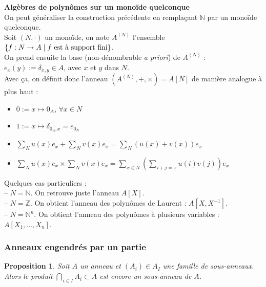 \documentclass{article}           %
\newcommand\N{\mathbb{N}}
\newcommand\Z{\mathbb{Z}}
\newcommand\summ[2]{\underset{#1}{\overset{#2}{\sum}}} 		%
\newcommand\capp[2]{\underset{#1}{\overset{#2}{\bigcap}}} 	%
\theoremstyle{break}
\theoremstyle{add}
\theoremstyle{break} %
\newtheorem{proposition}{Proposition}[section]
\theoremstyle{add}
\begin{document}
\vspace{0.5cm}

\textbf{Algèbres de polynômes sur un monoïde quelconque}\\
On peut généraliser la construction précédente en remplaçant $\N$ par un monoïde quelconque.\\
Soit $(N, \cdot)$ un monoïde, on note $A^{(N)}$ l'ensemble $\{f : N \rightarrow A \; | \; f \textnormal{ est à support fini} \}$. \\
On prend ensuite la base (non-dénombrable \textit{a priori}) de $A^{(N)}$ : $e_x(y) := \delta_{x,y} \in A$, avec $x$ et $y$ dans $N$. \\

Avec ça, on définit donc l'anneau $(A^{(N)}, +, \times) = A[N]$ de manière analogue à plus haut :

\begin{itemize}
\item $0 := x \mapsto 0_A$, $\forall x \in N$ 
\item $ 1 := x \mapsto \delta_{0_A,x} = e_{0_N}$
\item $\summ{N}{}u(x)e_x + \summ{N}{}v(x)e_x = \summ{N}{}(u(x)+v(x))e_x$
\item $\summ{N}{}u(x)e_x \times \summ{N}{}v(x)e_x = \summ{x \in N}{} \left( \summ{i+j=x}{}u(i)v(j)  \right) e_x $
\end{itemize}

Quelques cas particuliers : \\
– $N = \N$. On retrouve juste l'anneau $A[X]$. \\
– $N = \Z$. On obtient l'anneau des polynômes de Laurent : $A[X, X^{-1}]$. \\
– $N = \N^n$. On obtient l'anneau des polynômes à plusieurs variables : $A[X_1, \ldots, X_n]$. \\


\subsubsection{Anneaux engendrés par un partie}

\begin{proposition}
Soit $A$ un anneau et $(A_i) \in A_I$ une famille de sous-anneaux. Alors le produit $\capp{i \in I}{} A_i \subset A$ est encore un sous-anneau de $A$.
\end{proposition}
\end{document}
